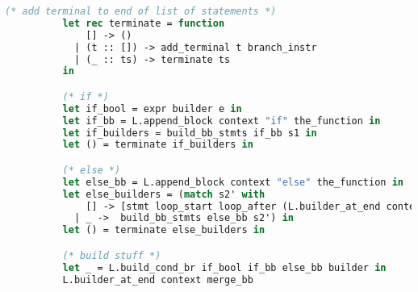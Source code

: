 \begin{lstlisting}[language=Caml,backgroundcolor=\color{backgroundcolor}]
          (* add terminal to end of list of statements *)
          let rec terminate = function
              [] -> ()
            | (t :: []) -> add_terminal t branch_instr
            | (_ :: ts) -> terminate ts
          in

          (* if *)
          let if_bool = expr builder e in
          let if_bb = L.append_block context "if" the_function in
          let if_builders = build_bb_stmts if_bb s1 in
          let () = terminate if_builders in

          (* else *)
          let else_bb = L.append_block context "else" the_function in
          let else_builders = (match s2' with
              [] -> [stmt loop_start loop_after (L.builder_at_end context else_bb) (SExpr (A.Int, SNoexpr))]
            | _ ->  build_bb_stmts else_bb s2') in
          let () = terminate else_builders in

          (* build stuff *)
          let _ = L.build_cond_br if_bool if_bb else_bb builder in
          L.builder_at_end context merge_bb


\end{lstlisting}
